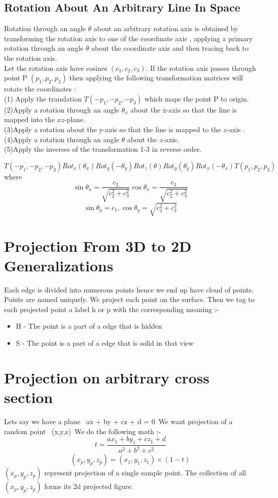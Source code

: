 \documentclass{article}
\begin{document}
\subsection{Rotation About An Arbitrary Line In Space}
Rotation through an angle $\theta$ about an arbitrary rotation axis is obtained by transforming the rotation axis to one of the coordinate axis , applying a primary rotation through an angle $\theta$ about the coordinate axis and then tracing back to the rotation axis. 
\\Let the rotation axis have cosines $(c_1,c_2,c_3)$. If the rotation axis passes through point P $(p_1,p_2,p_3)$ then applying the following transformation matrices will rotate the coordinates :
\\ (1) Apply the translation $ T(-p_{1},-p_{2},-p_{3})$ which maps the point P to origin.
\\ (2)Apply a rotation through an angle $\theta_{x}$ about the x-axis so that the line is mapped into the $xz$-plane.
\\ (3)Apply a rotation about the y-axis so that the line is mapped to the $z$-axis .
\\ (4)Apply a rotation through an angle $\theta$ about the $z$-axis.
\\ (5)Apply the inverses of the transformation 1-3 in reverse order.

$$    T(-p_{1},-p_{2},-p_{3})Rot_{x}(\theta_{x})Rot_{y}(-\theta_{y})Rot_{z}(\theta)Rot_{y}(\theta_{y})Rot_{x}(-\theta_{x})T(p_{1},p_{2},p_{3})$$
where 
$$\sin\theta_{x} = \frac{c_2}{\sqrt{c_2^2+c_3^2}}  \cos\theta_{x} = \frac{c_3}{\sqrt{c_2^2+c_3^2}} $$
$$ \sin\theta_{y} = c_1 , \cos\theta_{y} =\sqrt{c_2^2 + c_3^3}$$
\section{Projection From 3D to 2D Generalizations }
Each edge is divided into numerous points hence we end up have cloud of points. Points are named uniquely. We project each point on the surface. Then we tag to each projected point a label h or p with the corresponding meaning :-
\begin{itemize}
\item H - The point is a part of a edge that is hidden
\item S - The point is a part of a edge that is solid in that view
\end{itemize}

\section{Projection on arbitrary cross section}
Lets say we have a plane \ ax + by + cz + d = 0\
We want projection of a random point \ (x,y,z)\
We do the following math :-
 \[ t = \frac{ax_1+by_1+cz_1+d}{a^2+b^2+c^2} \]
 \[ (x_p,y_p,z_p)=(x_1,y_1,z_1)\times(1-t) \]
\((x_p , y_p , z_p)\) represent projection of a single sample point. 
The collection of all \((x_p , y_p , z_p)\) forms its 2d projected figure.
\end{document}
